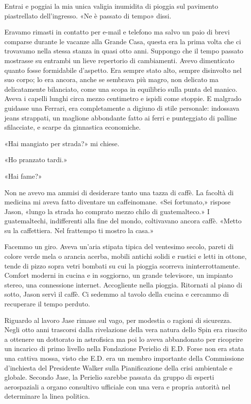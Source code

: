 Entrai e poggiai la mia unica valigia inumidita di pioggia sul pavimento
piastrellato dell'ingresso. «Ne è passato di tempo» dissi.

Eravamo rimasti in contatto per e-mail e telefono ma salvo un paio di
brevi comparse durante le vacanze alla Grande Casa, questa era la prima
volta che ci trovavamo nella stessa stanza in quasi otto anni. Suppongo
che il tempo passato mostrasse su entrambi un lieve repertorio di
cambiamenti. Avevo dimenticato quanto fosse formidabile d'aspetto. Era
sempre stato alto, sempre disinvolto nel suo corpo; lo era ancora, anche
se sembrava più magro, non delicato ma delicatamente bilanciato, come
una scopa in equilibrio sulla punta del manico. Aveva i capelli lunghi
circa mezzo centimetro e ispidi come stoppie. E malgrado guidasse una
Ferrari, era completamente a digiuno di stile personale: indossava jeans
strappati, un maglione abbondante fatto ai ferri e punteggiato di
palline sfilacciate, e scarpe da ginnastica economiche.

«Hai mangiato per strada?» mi chiese.

«Ho pranzato tardi.»

«Hai fame?»

Non ne avevo ma ammisi di desiderare tanto una tazza di caffè. La
facoltà di medicina mi aveva fatto diventare un caffeinomane. «Sei
fortunato,» rispose Jason, «lungo la strada ho comprato mezzo chilo di
guatemalteco.» I guatemaltechi, indifferenti alla fine del mondo,
coltivavano ancora caffè. «Metto su la caffettiera. Nel frattempo ti
mostro la casa.»

Facemmo un giro. Aveva un'aria stipata tipica del ventesimo secolo,
pareti di colore verde mela o arancia acerba, mobili antichi solidi e
rustici e letti in ottone, tende di pizzo sopra vetri bombati su cui la
pioggia scorreva ininterrottamente. Comfort moderni in cucina e in
soggiorno, un grande televisore, un impianto stereo, una connessione
internet. Accogliente nella pioggia. Ritornati al piano di sotto, Jason
servì il caffè. Ci sedemmo al tavolo della cucina e cercammo di
recuperare il tempo perduto.

Riguardo al lavoro Jase rimase sul vago, per modestia o ragioni di
sicurezza. Negli otto anni trascorsi dalla rivelazione della vera natura
dello Spin era riuscito a ottenere un dottorato in astrofisica ma poi lo
aveva abbandonato per ricoprire un incarico di primo livello nella
Fondazione Perielio di E.D. Forse non era stata una cattiva mossa, visto
che E.D. era un membro importante della Commissione d'inchiesta del
Presidente Walker sulla Pianificazione della crisi ambientale e globale.
Secondo Jase, la Perielio sarebbe passata da gruppo di esperti
aerospaziali a organo consultivo ufficiale con una vera e propria
autorità nel determinare la linea politica.

